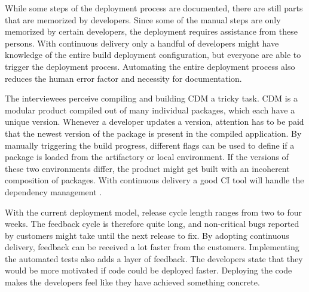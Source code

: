 \documentclass[english]{tktltiki2}
\theoremstyle{definition}
\theoremstyle{remark}
\begin{document}
While some steps of the deployment process are documented, there are still parts that are memorized by developers. Since some of the manual steps are only memorized by certain developers, the deployment requires assistance from these persons. With continuous delivery only a handful of developers might have knowledge of the entire build deployment configuration, but everyone are able to trigger the deployment process. Automating the entire deployment process also reduces the human error factor and necessity for documentation.

The interviewees perceive compiling and building CDM a tricky task. CDM is a modular product compiled out of many individual packages, which each have a unique version. Whenever a developer updates a version, attention has to be paid that the newest version of the package is present in the compiled application. By manually triggering the build progress, different flags can be used to define if a package is loaded from the artifactory or local environment. If the versions of these two environments differ, the product might get built with an incoherent composition of packages. With continuous delivery a good CI tool will handle the dependency management \cite{cdbook}.



With the current deployment model, release cycle length ranges from two to four weeks. The feedback cycle is therefore quite long, and non-critical bugs reported by customers might take until the next release to fix. By adopting continuous delivery, feedback can be received a lot faster from the customers. Implementing the automated tests also adds a layer of feedback. The developers state that they would be more motivated if code could be deployed faster. Deploying the code makes the developers feel like they have achieved something concrete. 
\end{document}
